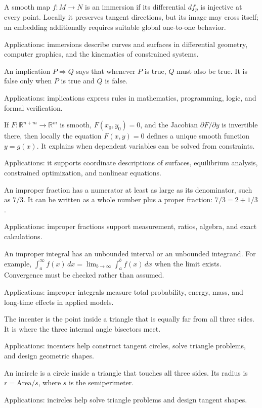 A smooth map $f:M\to N$ is an immersion if its differential $df_p$ is injective at every point. Locally it preserves tangent directions, but its image may cross itself; an embedding additionally requires suitable global one-to-one behavior. \par\noindent Applications: immersions describe curves and surfaces in differential geometry, computer graphics, and the kinematics of constrained systems.

An implication $P\Rightarrow Q$ says that whenever $P$ is true, $Q$ must also be true. It is false only when $P$ is true and $Q$ is false. \par\noindent Applications: implications express rules in mathematics, programming, logic, and formal verification.

If $F:\mathbb R^{n+m}\to\mathbb R^m$ is smooth, $F(x_0,y_0)=0$, and the Jacobian $\partial F/\partial y$ is invertible there, then locally the equation $F(x,y)=0$ defines a unique smooth function $y=g(x)$. It explains when dependent variables can be solved from constraints. \par\noindent Applications: it supports coordinate descriptions of surfaces, equilibrium analysis, constrained optimization, and nonlinear equations.

An improper fraction has a numerator at least as large as its denominator, such as $7/3$. It can be written as a whole number plus a proper fraction: $7/3=2+1/3$. \par\noindent Applications: improper fractions support measurement, ratios, algebra, and exact calculations.

An improper integral has an unbounded interval or an unbounded integrand. For example, $\int_a^\infty f(x)\,dx=\lim_{b\to\infty}\int_a^b f(x)\,dx$ when the limit exists. Convergence must be checked rather than assumed. \par\noindent Applications: improper integrals measure total probability, energy, mass, and long-time effects in applied models.

The incenter is the point inside a triangle that is equally far from all three sides. It is where the three internal angle bisectors meet. \par\noindent Applications: incenters help construct tangent circles, solve triangle problems, and design geometric shapes.

An incircle is a circle inside a triangle that touches all three sides. Its radius is $r=\text{Area}/s$, where $s$ is the semiperimeter. \par\noindent Applications: incircles help solve triangle problems and design tangent shapes.

